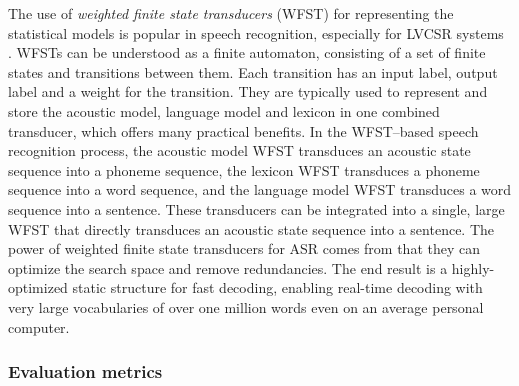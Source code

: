 \documentclass[english, 12pt, a4paper, pdftex, elec, utf8]{aaltothesis}
\begin{document}
The use of \textit{weighted finite state transducers} (WFST) for representing the statistical models is popular in speech recognition, especially for LVCSR systems \cite{hori2013speech, mohri2008speech, smit17boundaries}. WFSTs can be understood as a finite automaton, consisting of a set of finite states and transitions between them. Each transition has an input label, output label and a weight for the transition. They are typically used to represent and store the acoustic model, language model and lexicon in one combined transducer, which offers many practical benefits. In the WFST--based speech recognition process, the acoustic model WFST transduces an acoustic state sequence into a phoneme sequence, the lexicon WFST transduces a phoneme sequence into a word sequence, and the language model WFST transduces a word sequence into a sentence. These transducers can be integrated into a single, large WFST that directly transduces an acoustic state sequence into a sentence. The power of weighted finite state transducers for ASR comes from that they can optimize the search space and remove redundancies. The end result is a highly-optimized static structure for fast decoding, enabling real-time decoding with very large vocabularies of over one million words even on an average personal computer. \cite[p.~4--6]{hori2013speech}

\subsubsection{Evaluation metrics}
\end{document}
